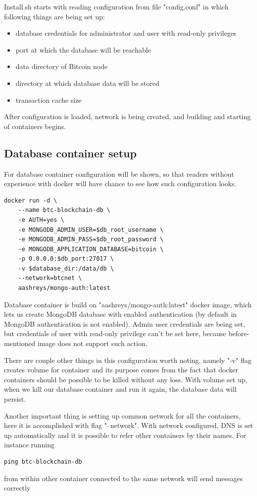 \documentclass[12pt, en, eng, oneside]{mgr}
\begin{document}
Install.sh starts with reading configuration from file "config.conf" in which following things are being set up:

\begin{itemize}
\item
database credentials for administrator and user with read-only privileges
\item
port at which the database will be reachable
\item
data directory of Bitcoin node
\item
directory at which database data will be stored
\item
transaction cache size
\end{itemize} 

After configuration is loaded, network is being created, and building and starting of containers begins.

\subsection{Database container setup}
For database container configuration will be shown, so that readers without experience with docker will have chance to see how such configuration looks.

\begin{verbatim}
docker run -d \
    --name btc-blockchain-db \
    -e AUTH=yes \
    -e MONGODB_ADMIN_USER=$db_root_username \
    -e MONGODB_ADMIN_PASS=$db_root_password \
    -e MONGODB_APPLICATION_DATABASE=bitcoin \
    -p 0.0.0.0:$db_port:27017 \
    -v $database_dir:/data/db \
    --network=btcnet \
    aashreys/mongo-auth:latest
\end{verbatim}

Database container is build on "aashreys/mongo-auth:latest" docker image, which lets us create MongoDB database with enabled authentication (by default in MongoDB authentication is not enabled).
Admin user credentials are being set, but credentials of user with read-only privilege can't be set here, because before-mentioned image does not support such action.

There are couple other things in this configuration worth noting, namely "-v" flag creates volume for container and its purpose comes from the fact that docker containers should be possible to be killed without any loss. With volume set up, when we kill our database container and run it again, the database data will persist.

Another important thing is setting up common network for all the containers, here it is accomplished with flag "--network". With network configured, DNS is set up automatically and it is possible to refer other containers by their names. For instance running 
\begin{verbatim}
ping btc-blockchain-db
\end{verbatim}  
from within other container connected to the same network will send messages correctly
\end{document}
